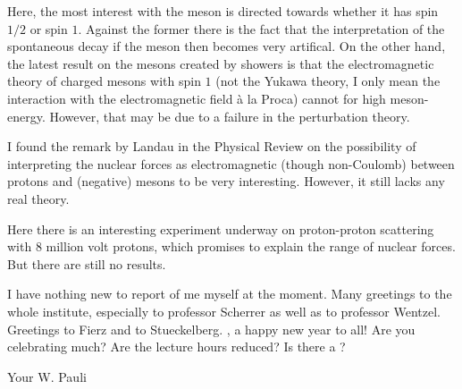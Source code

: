 Here, the most interest with the meson is directed towards whether it has spin $1/2$ or spin $1$. Against the former there is the fact that the interpretation of the spontaneous decay if the meson then becomes very artifical. On the other hand, the latest result on the mesons created by showers is that the electromagnetic theory of charged mesons with spin $1$ (not the Yukawa theory, I only mean the interaction with the electromagnetic field \`a la Proca) cannot  for high meson-energy. However, that may be due to a failure in the perturbation theory.

I found the remark by Landau in the Physical Review on the possibility of interpreting the nuclear forces as electromagnetic (though non-Coulomb) between protons and (negative) mesons to be very interesting. However, it still lacks any real theory.

Here there is an interesting experiment underway on proton-proton scattering with 8 million volt protons, which promises to explain the range of nuclear forces. But there are still no results.

I have nothing new to report of me myself at the moment. Many greetings to the whole institute, especially to professor Scherrer as well as to professor Wentzel. Greetings to Fierz and to Stueckelberg. , a happy new year to all! Are you celebrating much? Are the lecture hours reduced? Is there a ?

Your W. Pauli

